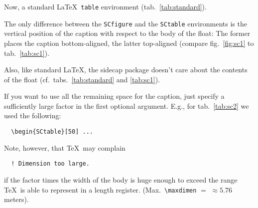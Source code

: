 \documentclass[12pt,a4paper]{article}
\begin{document}
\clearpage

Now, a standard \LaTeX\ \texttt{table} environment
(tab.~\ref{tab:standard}).

\begin{table}[h]
  \centering
  \caption[\SHORTCAPi]{\CAPi}
  \TABi%
  \label{tab:standard}
\end{table}

The only difference between the \verb|SCfigure| and the
\verb|SCtable| environments is the vertical position of the
caption with respect to the body of the float:
The former places the caption bottom-aligned, the latter top-aligned
(compare fig.~\ref{fig:sc1} to tab.~\ref{tab:sc1}).

Also, like standard \LaTeX, the \textsf{sidecap} package doesn't care
about the contents of the float (cf.\ tabs.~\ref{tab:standard} and
\ref{tab:sc1}).

\begin{SCtable}
  \caption[\SHORTCAPi]{\CAPi}  
  \label{tab:sc1}
\end{SCtable}

If you want to use all the remaining space for the caption, just
specify a sufficiently large factor in the first optional argument.
E.g., for tab.~\ref{tab:sc2} we used the following:
%
\begin{verbatim}
  \begin{SCtable}[50] ...
\end{verbatim}
%
Note, however, that \TeX\ may complain
%
\begin{verbatim}
  ! Dimension too large.
\end{verbatim}
%
if the factor times the width of the body is huge enough to exceed
the range \TeX\ is able to represent in a length register.
%
(Max.\ \verb|\maxdimen|%
${}={}$\the\maxdimen
${}\approx 5.76$\,{meters}).


\begin{SCtable}[50]
  \caption[\SHORTCAPi]{\CAPi}
  \label{tab:sc2}
\end{SCtable}
\end{document}
